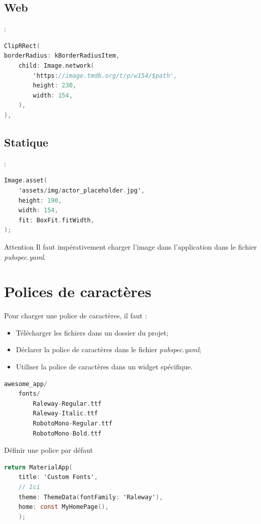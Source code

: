 \documentclass[10pt]{beamer}
\begin{document}
\subsection{Web}
\begin{frame}[fragile]{\secname : \subsecname}
    \begin{lstlisting}[language=C]
ClipRRect(
borderRadius: kBorderRadiusItem,
    child: Image.network(
        'https://image.tmdb.org/t/p/w154/$path',
        height: 230,
        width: 154,
    ),
),
\end{lstlisting}
\end{frame}
\subsection{Statique}
\begin{frame}[fragile]{\secname : \subsecname}
    \begin{lstlisting}[language=C]
Image.asset(
    'assets/img/actor_placeholder.jpg',
    height: 190,
    width: 154,
    fit: BoxFit.fitWidth,
);
\end{lstlisting}
    \begin{alertblock}{Attention}
        Il faut impérativement charger l'image dans l'application dans le fichier \emph{pubspec.yaml}.
    \end{alertblock}
\end{frame}

\section{Polices de caractères}
\begin{frame}[fragile]{\secname}
    Pour charger une police de caractères, il faut :
    \begin{itemize}
        \item Télécharger les fichiers dans un dossier du projet;
        \item Déclarer la police de caractères dans le fichier \emph{pubspec.yaml};
        \item Utiliser la police de caractères dans un widget spécifique.
    \end{itemize}
    \begin{lstlisting}[language=C]
awesome_app/
    fonts/
        Raleway-Regular.ttf
        Raleway-Italic.ttf
        RobotoMono-Regular.ttf
        RobotoMono-Bold.ttf
\end{lstlisting}
\end{frame}

\begin{frame}[fragile]{\secname}
    Définir une police par défaut
    \begin{lstlisting}[language=C]
return MaterialApp(
    title: 'Custom Fonts',
    // Ici
    theme: ThemeData(fontFamily: 'Raleway'),
    home: const MyHomePage(),
    );
\end{lstlisting}
\end{frame}
\end{document}
